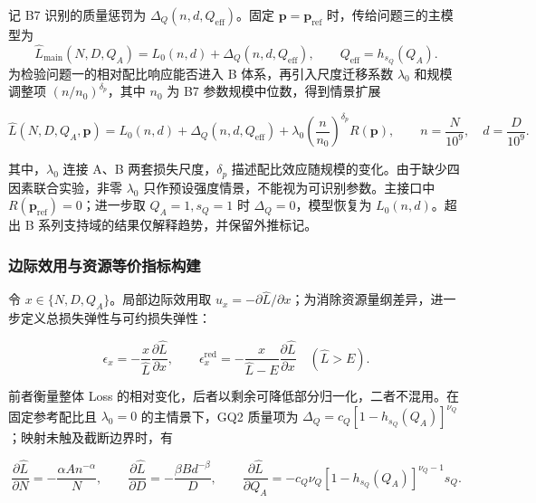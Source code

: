 记 B7 识别的质量惩罚为 $\Delta_Q(n,d,Q_{\mathrm{eff}})$。固定 $\boldsymbol p=\boldsymbol p_{\mathrm{ref}}$ 时，传给问题三的主模型为
\begin{equation}
\widehat L_{\mathrm{main}}(N,D,Q_A)
=L_0(n,d)+\Delta_Q\!\left(n,d,Q_{\mathrm{eff}}\right),
\qquad Q_{\mathrm{eff}}=h_{s_Q}(Q_A).
\label{eq:p2_main_interface}
\end{equation}
为检验问题一的相对配比响应能否进入 B 体系，再引入尺度迁移系数 $\lambda_0$ 和规模调整项 $(n/n_0)^{\delta_p}$，其中 $n_0$ 为 B7 参数规模中位数，得到情景扩展

\begin{equation}
\widehat L(N,D,Q_A,\boldsymbol p)
=
L_0(n,d)
+
\Delta_Q
\left(
n,d,Q_{\mathrm{eff}}
\right)
+
\lambda_0
\left(
\frac n{n_0}
\right)^{\delta_p}
R(\boldsymbol p),
\qquad
n=\frac{N}{10^9},
\quad
d=\frac{D}{10^9}.
\label{eq:p2_generalized}
\end{equation}

其中，$\lambda_0$ 连接 A、B 两套损失尺度，$\delta_p$ 描述配比效应随规模的变化。由于缺少四因素联合实验，非零 $\lambda_0$ 只作预设强度情景，不能视为可识别参数。主接口中 $R(\boldsymbol p_{\mathrm{ref}})=0$；进一步取 $Q_A=1,s_Q=1$ 时 $\Delta_Q=0$，模型恢复为 $L_0(n,d)$。超出 B 系列支持域的结果仅解释趋势，并保留外推标记。

\subsubsection{边际效用与资源等价指标构建}

令 $x\in\{N,D,Q_A\}$。局部边际效用取 $u_x=-\partial\widehat L/\partial x$；为消除资源量纲差异，进一步定义总损失弹性与可约损失弹性：

\begin{equation}
\epsilon_x=-\frac{x}{\widehat L}\frac{\partial\widehat L}{\partial x},
\qquad
\epsilon_x^{\mathrm{red}}=-\frac{x}{\widehat L-E}\frac{\partial\widehat L}{\partial x}
\quad(\widehat L>E).
\label{eq:p2_elasticity}
\end{equation}

前者衡量整体 Loss 的相对变化，后者以剩余可降低部分归一化，二者不混用。在固定参考配比且 $\lambda_0=0$ 的主情景下，GQ2 质量项为 $\Delta_Q=c_Q[1-h_{s_Q}(Q_A)]^{\nu_Q}$；映射未触及截断边界时，有

\begin{equation}
\frac{\partial\widehat L}{\partial N}
=
-\frac{\alpha A n^{-\alpha}}{N},
\qquad
\frac{\partial\widehat L}{\partial D}
=
-\frac{\beta B d^{-\beta}}{D},
\qquad
\frac{\partial\widehat L}{\partial Q_A}
=
-c_Q\nu_Q
[1-h_{s_Q}(Q_A)]^{\nu_Q-1}s_Q .
\label{eq:p2_derivatives}
\end{equation}

